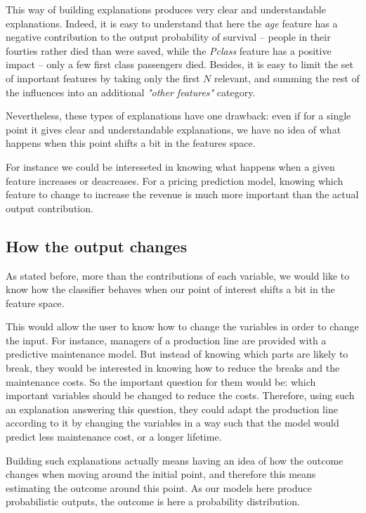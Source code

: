 \documentclass[a4paper,11pt]{kth-mag}
\begin{document}
This way of building explanations produces very clear and understandable explanations. Indeed, it is easy to understand that here the \textit{age} feature has a negative contribution to the output probability of survival -- people in their fourties rather died than were saved, while the \textit{Pclass} feature has a positive impact -- only a few first class passengers died. Besides, it is easy to limit the set of important features by taking only the first $N$ relevant, and summing the rest of the influences into an additional \textit{"other features"} category.

Nevertheless, these types of explanations have one drawback: even if for a single point it gives clear and understandable explanations, we have no idea of what happens when this point shifts a bit in the features space.

For instance we could be intereseted in knowing what happens when a given feature increases or deacreases. For a pricing prediction model, knowing which feature to change to increase the revenue is much more important than the actual output contribution.

\subsection{How the output changes}

As stated before, more than the contributions of each variable, we would like to know how the classifier behaves when our point of interest shifts a bit in the feature space.

This would allow the user to know how to change the variables in order to change the input. For instance, managers of a production line are provided with a predictive maintenance model. But instead of knowing which parts are likely to break, they would be interested in knowing how to reduce the breaks and the maintenance costs. So the important question for them would be: which important variables should be changed to reduce the costs. Therefore, using such an explanation answering this question, they could adapt the production line  according to it by changing the variables in a way such that the model would predict less maintenance cost, or a longer lifetime.

Building such explanations actually means having an idea of how the outcome changes when moving around the initial point, and therefore this means estimating the outcome around this point. As our models here produce probabilistic outputs, the outcome is here a probability distribution.
\end{document}

